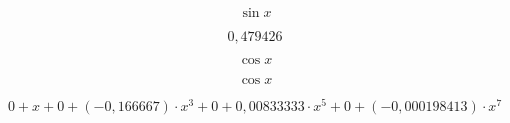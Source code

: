 \documentclass[a4paper]{article}
\begin{document}
$$
\sin{x}
$$

$$
0,479426
$$

$$
\cos{x}
$$

$$
\cos{x}
$$

$$
0+{x}+{0}+{\left(-0,166667\right)\cdot{x^{3}}}+{0}+{0,00833333\cdot{x^{5}}}+{0}+{\left(-0,000198413\right)\cdot{x^{7}}}
$$
\end{document}
